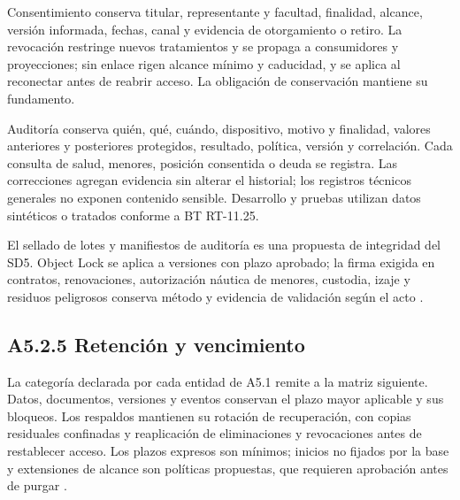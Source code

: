Consentimiento conserva titular, representante y facultad, finalidad, alcance, versión informada, fechas, canal y evidencia de otorgamiento o retiro. La revocación restringe nuevos tratamientos y se propaga a consumidores y proyecciones; sin enlace rigen alcance mínimo y caducidad, y se aplica al reconectar antes de reabrir acceso. La obligación de conservación mantiene su fundamento.

Auditoría conserva quién, qué, cuándo, dispositivo, motivo y finalidad, valores anteriores y posteriores protegidos, resultado, política, versión y correlación. Cada consulta de salud, menores, posición consentida o deuda se registra. Las correcciones agregan evidencia sin alterar el historial; los registros técnicos generales no exponen contenido sensible. Desarrollo y pruebas utilizan datos sintéticos o tratados conforme a BT RT-11.25.

El sellado de lotes y manifiestos de auditoría es una propuesta de integridad del SD5. Object Lock se aplica a versiones con plazo aprobado; la firma exigida en contratos, renovaciones, autorización náutica de menores, custodia, izaje y residuos peligrosos conserva método y evidencia de validación según el acto \parencites{aws-object-lock}[RT-16.14]{pucv-caso07}.

\subsection*{A5.2.5 Retención y vencimiento}

La categoría declarada por cada entidad de A5.1 remite a la matriz siguiente. Datos, documentos, versiones y eventos conservan el plazo mayor aplicable y sus bloqueos. Los respaldos mantienen su rotación de recuperación, con copias residuales confinadas y reaplicación de eliminaciones y revocaciones antes de restablecer acceso. Los plazos expresos son mínimos; inicios no fijados por la base y extensiones de alcance son políticas propuestas, que requieren aprobación antes de purgar \parencites[RT-05.10]{pucv-caso07}[RT-11.14 y RT-16.10]{pucv-bases-transversales}.

